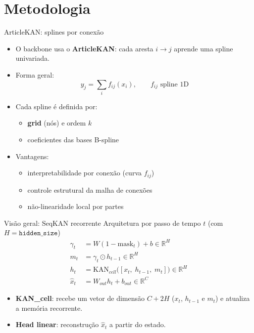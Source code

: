 \documentclass[10pt]{beamer}
\begin{document}
\section{Metodologia}

\begin{frame}{ArticleKAN: splines por conex\~ao}
\small
\begin{itemize}
\item O backbone usa o \textbf{ArticleKAN}: cada aresta $i\!\to\! j$ aprende uma spline univariada.
\item Forma geral:
\[
y_j = \sum_i f_{ij}(x_i), \qquad f_{ij} \text{ spline 1D}
\]
\item Cada spline \'{e} definida por:
\begin{itemize}
\item \textbf{grid} (n\'os) e ordem $k$
\item coeficientes das bases B-spline
\end{itemize}
\item Vantagens:
\begin{itemize}
\item interpretabilidade por conex\~ao (curva $f_{ij}$)
\item controle estrutural da malha de conex\~oes
\item n\~ao-linearidade local por partes
\end{itemize}
\end{itemize}
\end{frame}

\begin{frame}{Vis\~ao geral: SeqKAN recorrente}
\small
Arquitetura por passo de tempo $t$ (com $H=\texttt{hidden\_size}$)
\[
\boxed{
\begin{aligned}
\gamma_t &= W(1-\mathrm{mask}_t) + b \in \mathbb{R}^{H} \\
m_t &= \gamma_t \odot h_{t-1} \in \mathbb{R}^{H} \\
h_t &= \mathrm{KAN}_{cell}\big([x_t,\; h_{t-1},\; m_t]\big) \in \mathbb{R}^{H} \\
\hat{x}_t &= W_{out}h_t + b_{out} \in \mathbb{R}^{C}
\end{aligned}}
\]

\begin{itemize}
\item \textbf{KAN\_cell}: recebe um vetor de dimens\~ao $C+2H$ ($x_t$, $h_{t-1}$ e $m_t$) e atualiza a mem\'oria recorrente.
\item \textbf{Head linear}: reconstru\c{c}\~ao $\hat{x}_t$ a partir do estado.
\end{itemize}
\end{frame}
\end{document}
